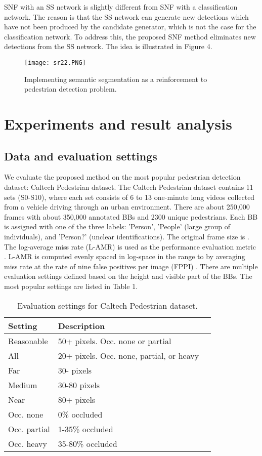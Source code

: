 \documentclass[10pt,letterpaper]{article}
\begin{document}
SNF with an SS network is slightly different from SNF with a classification network. The reason is that the SS network can generate new detections which have not been produced by the candidate generator, which is not the case for the classification network. To address this, the proposed SNF method eliminates new detections from the SS network. The idea is illustrated in Figure 4.

\begin{figure}
\begin{center}
   \texttt{[image: sr22.PNG]}
\end{center}
   \caption{Implementing semantic segmentation as a reinforcement to pedestrian detection problem.}
\label{fig:short}
\end{figure}


\section{Experiments and result analysis}

\subsection{Data and evaluation settings}
We evaluate the proposed method on the most popular pedestrian detection dataset: Caltech Pedestrian dataset. The Caltech Pedestrian dataset contains 11 sets (S0-S10), where each set consists of 6 to 13 one-minute long videos collected from a vehicle driving through an urban environment. There are about 250,000 frames with about 350,000 annotated BBs and 2300 unique pedestrians. Each BB is assigned with one of the three labels: 'Person', 'People' (large group of individuals), and 'Person?' (unclear identifications). 
The original frame size is  . The log-average miss rate (L-AMR) is used as the performance evaluation metric \cite{caltech}. L-AMR is computed evenly spaced in log-space in the range  to  by averaging miss rate at the rate of nine false positives per image (FPPI) \cite{caltech}. There are multiple evaluation settings defined based on the height and visible part of the BBs. The most popular settings are listed in Table 1. 

\begin{table}[h!]
\begin{center}
\begin{tabular}{|l|l|l|}
\hline
Setting & Description\\
\hline\hline
Reasonable & 50+ pixels. Occ. none or partial\\
All & 20+ pixels. Occ. none, partial, or heavy\\
Far & 30- pixels\\
Medium & 30-80 pixels\\
Near & 80+ pixels\\
Occ. none & 0\% occluded\\
Occ. partial & 1-35\% occluded\\
Occ. heavy & 35-80\% occluded\\
\hline
\end{tabular}
\end{center}
\caption{Evaluation settings for Caltech Pedestrian dataset.}
\end{table}
\end{document}
